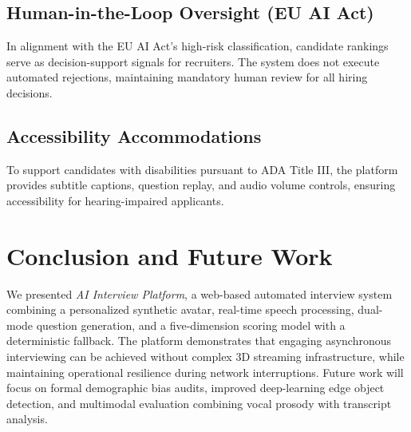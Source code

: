 \documentclass[conference]{IEEEtran}
\begin{document}
\subsection{Human-in-the-Loop Oversight (EU AI Act)}

In alignment with the EU AI Act's high-risk classification, candidate rankings serve as decision-support signals for recruiters. The system does not execute automated rejections, maintaining mandatory human review for all hiring decisions.

\subsection{Accessibility Accommodations}

To support candidates with disabilities pursuant to ADA Title III, the platform provides subtitle captions, question replay, and audio volume controls, ensuring accessibility for hearing-impaired applicants.

\section{Conclusion and Future Work}

We presented \textit{AI Interview Platform}, a web-based automated interview system combining a personalized synthetic avatar, real-time speech processing, dual-mode question generation, and a five-dimension scoring model with a deterministic fallback. The platform demonstrates that engaging asynchronous interviewing can be achieved without complex 3D streaming infrastructure, while maintaining operational resilience during network interruptions. Future work will focus on formal demographic bias audits, improved deep-learning edge object detection, and multimodal evaluation combining vocal prosody with transcript analysis.
\end{document}
